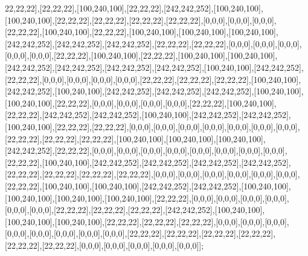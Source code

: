 22,22,22],[22,22,22],[100,240,100],[22,22,22],[242,242,252],[100,240,100],[100,240,100],[22,22,22],[22,22,22],[22,22,22],[22,22,22],[0,0,0],[0,0,0],[0,0,0],[22,22,22],[100,240,100],[22,22,22],[100,240,100],[100,240,100],[100,240,100],[242,242,252],[242,242,252],[242,242,252],[22,22,22],[22,22,22],[0,0,0],[0,0,0],[0,0,0],[0,0,0],[0,0,0],[22,22,22],[100,240,100],[22,22,22],[100,240,100],[100,240,100],[242,242,252],[242,242,252],[242,242,252],[242,242,252],[100,240,100],[242,242,252],[22,22,22],[0,0,0],[0,0,0],[0,0,0],[0,0,0],[22,22,22],[22,22,22],[22,22,22],[100,240,100],[242,242,252],[100,240,100],[242,242,252],[242,242,252],[242,242,252],[100,240,100],[100,240,100],[22,22,22],[0,0,0],[0,0,0],[0,0,0],[0,0,0],[22,22,22],[100,240,100],[22,22,22],[242,242,252],[242,242,252],[100,240,100],[242,242,252],[242,242,252],[100,240,100],[22,22,22],[22,22,22],[0,0,0],[0,0,0],[0,0,0],[0,0,0],[0,0,0],[0,0,0],[0,0,0],[22,22,22],[22,22,22],[22,22,22],[100,240,100],[100,240,100],[100,240,100],[242,242,252],[22,22,22],[0,0,0],[0,0,0],[0,0,0],[0,0,0],[0,0,0],[0,0,0],[0,0,0],[0,0,0],[22,22,22],[100,240,100],[242,242,252],[242,242,252],[242,242,252],[242,242,252],[22,22,22],[22,22,22],[22,22,22],[22,22,22],[0,0,0],[0,0,0],[0,0,0],[0,0,0],[0,0,0],[0,0,0],[22,22,22],[100,240,100],[100,240,100],[242,242,252],[242,242,252],[100,240,100],[100,240,100],[100,240,100],[100,240,100],[22,22,22],[0,0,0],[0,0,0],[0,0,0],[0,0,0],[0,0,0],[0,0,0],[22,22,22],[22,22,22],[22,22,22],[242,242,252],[100,240,100],[100,240,100],[100,240,100],[22,22,22],[22,22,22],[22,22,22],[0,0,0],[0,0,0],[0,0,0],[0,0,0],[0,0,0],[0,0,0],[0,0,0],[0,0,0],[22,22,22],[22,22,22],[22,22,22],[22,22,22],[22,22,22],[22,22,22],[0,0,0],[0,0,0],[0,0,0],[0,0,0],[0,0,0]];

